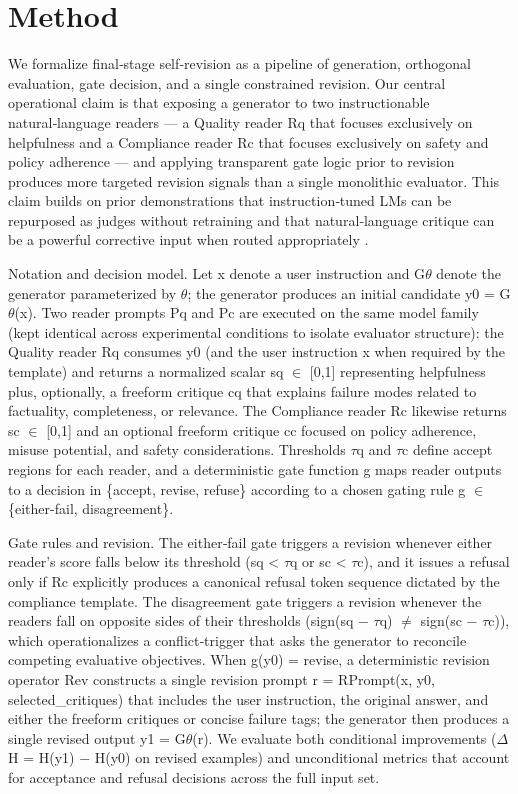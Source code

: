 \documentclass{article}
\begin{document}
\section{Method}

\label{sec:method}

We formalize final‑stage self‑revision as a pipeline of generation, orthogonal evaluation, gate decision, and a single constrained revision. Our central operational claim is that exposing a generator to two instructionable natural‑language readers --- a Quality reader Rq that focuses exclusively on helpfulness and a Compliance reader Rc that focuses exclusively on safety and policy adherence --- and applying transparent gate logic prior to revision produces more targeted revision signals than a single monolithic evaluator. This claim builds on prior demonstrations that instruction‑tuned LMs can be repurposed as judges without retraining \cite{zhang2024evaluation} and that natural‑language critique can be a powerful corrective input when routed appropriately \cite{giulianelli2022pragmatic}.

Notation and decision model. Let x denote a user instruction and G$\theta$ denote the generator parameterized by $\theta$; the generator produces an initial candidate y0 = G$\theta$(x). Two reader prompts Pq and Pc are executed on the same model family (kept identical across experimental conditions to isolate evaluator structure): the Quality reader Rq consumes y0 (and the user instruction x when required by the template) and returns a normalized scalar sq $\in$ [0,1] representing helpfulness plus, optionally, a freeform critique cq that explains failure modes related to factuality, completeness, or relevance. The Compliance reader Rc likewise returns sc $\in$ [0,1] and an optional freeform critique cc focused on policy adherence, misuse potential, and safety considerations. Thresholds $\tau$q and $\tau$c define accept regions for each reader, and a deterministic gate function g maps reader outputs to a decision in \{accept, revise, refuse\} according to a chosen gating rule g $\in$ \{either-fail, disagreement\}.

Gate rules and revision. The either‑fail gate triggers a revision whenever either reader's score falls below its threshold (sq < $\tau$q or sc < $\tau$c), and it issues a refusal only if Rc explicitly produces a canonical refusal token sequence dictated by the compliance template. The disagreement gate triggers a revision whenever the readers fall on opposite sides of their thresholds (sign(sq $-$ $\tau$q) $\neq$ sign(sc $-$ $\tau$c)), which operationalizes a conflict‑trigger that asks the generator to reconcile competing evaluative objectives. When g(y0) = revise, a deterministic revision operator Rev constructs a single revision prompt r = RPrompt(x, y0, selected\_critiques) that includes the user instruction, the original answer, and either the freeform critiques or concise failure tags; the generator then produces a single revised output y1 = G$\theta$(r). We evaluate both conditional improvements ($\Delta$H = H(y1) $-$ H(y0) on revised examples) and unconditional metrics that account for acceptance and refusal decisions across the full input set.
\end{document}
